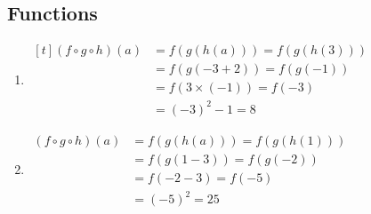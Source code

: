 \subsection{Functions}

\begin{exercise}{9}
  \begin{enumerate}
    \item $\begin{aligned}[t]
            (f \circ g \circ h)(a) &= f(g(h(a))) = f(g(h(3))) \\
                                   &= f(g(-3+2)) = f(g(-1)) \\
                                   &= f(3 \times (-1)) = f(-3) \\
                                   &= (-3)^2-1 = 8
          \end{aligned}$
    \item $\begin{aligned}
            (f \circ g \circ h)(a) &= f(g(h(a))) = f(g(h(1))) \\
                                   &= f(g(1-3)) = f(g(-2)) \\
                                   &= f(-2-3) = f(-5) \\
                                   &= (-5)^2 = 25
          \end{aligned}$
  \end{enumerate}
\end{exercise}
